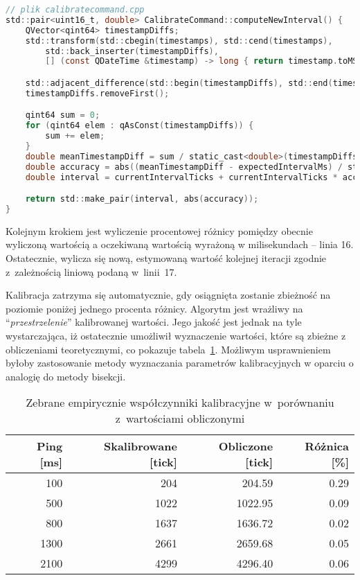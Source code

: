 \begin{lstlisting}[language=C,
    caption={Algorytm wyznaczania kolejnej wartości dla funkcjonalności kalibracji},
    label={lst:calibration-cpp}]
// plik calibratecommand.cpp
std::pair<uint16_t, double> CalibrateCommand::computeNewInterval() {
	QVector<qint64> timestampDiffs;
	std::transform(std::cbegin(timestamps), std::cend(timestamps),
		std::back_inserter(timestampDiffs),
		[] (const QDateTime &timestamp) -> long { return timestamp.toMSecsSinceEpoch(); });

	std::adjacent_difference(std::begin(timestampDiffs), std::end(timestampDiffs), std::begin(timestampDiffs));
	timestampDiffs.removeFirst();

	qint64 sum = 0;
	for (qint64 elem : qAsConst(timestampDiffs)) {
		sum += elem;
	}
	double meanTimestampDiff = sum / static_cast<double>(timestampDiffs.size());
	double accuracy = abs((meanTimestampDiff - expectedIntervalMs) / static_cast<double>(expectedIntervalMs));
	double interval = currentIntervalTicks + currentIntervalTicks * accuracy; // this isn't stable if we overshoot the correct value...

	return std::make_pair(interval, abs(accuracy));
}
\end{lstlisting}


Kolejnym krokiem jest wyliczenie procentowej różnicy pomiędzy obecnie wyliczoną wartością
a oczekiwaną wartością wyrażoną w milisekundach -- linia 16. Ostatecznie, wylicza się
nową, estymowaną wartość kolejnej iteracji zgodnie z~zależnością liniową podaną w~linii~17.

Kalibracja zatrzyma się automatycznie, gdy osiągnięta zostanie zbieżność na poziomie poniżej
jednego procenta różnicy. Algorytm jest wrażliwy na \enquote{\textit{przestrzelenie}} kalibrowanej
wartości. Jego jakość jest jednak na tyle wystarczająca, iż ostatecznie umożliwił wyznaczenie
wartości, które są zbieżne z obliczeniami teoretycznymi, co pokazuje tabela~\ref{tab:calibration_vs_computation}.
Możliwym usprawnieniem byłoby zastosowanie metody wyznaczania parametrów
kalibracyjnych w oparciu o analogię do metody bisekcji.

\begin{table}[!ht]
\centering
	\begin{tabular}{r|r|r|r}
	Ping [ms]         & Skalibrowane [tick] & Obliczone [tick]  & Różnica [\%] \\\hline
	100               & 204                 & 204.59            & 0.29         \\\hline
	500               & 1022                & 1022.95           & 0.09         \\\hline
	800               & 1637                & 1636.72           & 0.02         \\\hline
	1300              & 2661                & 2659.68           & 0.05         \\\hline
	2100              & 4299                & 4296.40           & 0.06         \\\hline
	\end{tabular}
\caption{\label{tab:calibration_vs_computation}Zebrane empirycznie współczynniki kalibracyjne w~porównaniu z~wartościami obliczonymi}
\end{table}


